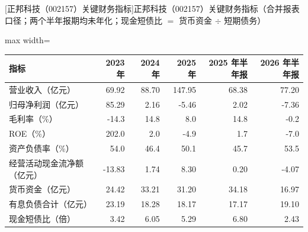 \begin{center}\small\setlength{\tabcolsep}{3.4pt}
[正邦科技（002157）关键财务指标]{正邦科技（002157）关键财务指标（合并报表口径；两个半年报期均未年化；现金短债比 $=$ 货币资金 $\div$ 短期债务）}
\begin{adjustbox}{max width=\textwidth}
\begin{tabular}{@{}lrrrrr@{}}
\toprule
指标 & 2023 年 & 2024 年 & 2025 年 & 2025 年半年报 & 2026 年半年报 \\
\midrule
营业收入（亿元） & 69.92 & 88.70 & 147.95 & 68.38 & 77.20 \\
归母净利润（亿元） & 85.29 & 2.16 & -5.46 & 2.02 & -7.36 \\
毛利率（\%） & -14.3 & 14.8 & 8.0 & 14.8 & -0.2 \\
ROE（\%） & 202.0 & 2.0 & -4.9 & 1.7 & -7.0 \\
资产负债率（\%） & 54.0 & 46.4 & 50.1 & 45.7 & 53.5 \\
经营活动现金流净额（亿元） & -13.83 & 1.74 & 8.30 & 0.20 & -4.07 \\
货币资金（亿元） & 24.42 & 33.21 & 31.20 & 34.18 & 16.97 \\
有息负债合计（亿元） & 23.19 & 18.28 & 18.17 & 17.17 & 19.10 \\
现金短债比（倍） & 3.42 & 6.05 & 5.29 & 6.80 & 2.43 \\
\bottomrule
\end{tabular}
\end{adjustbox}
\end{center}

